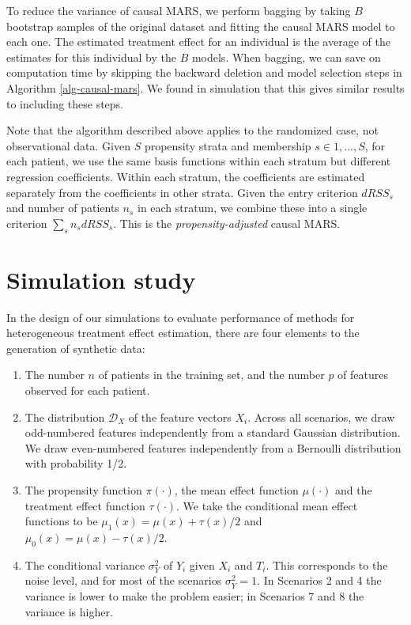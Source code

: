 \documentclass{article}
\def\D{\mathcal{D}}\def\F{\mathcal{F}}\def\K{\mathcal{K}}\def\N{\mathcal{N}}
\begin{document}
To reduce the variance of causal MARS, we perform bagging by taking $B$
bootstrap samples of the original dataset and fitting the causal MARS model to
each one. The estimated treatment effect for an individual is the average of
the estimates for this individual by the $B$ models. When bagging, we can save
on computation time by skipping the backward deletion and model selection steps
in Algorithm \ref{alg-causal-mars}. We found in simulation that this gives
similar results to including these steps.

Note that the algorithm described above applies to the randomized case, not
observational data. Given $S$ propensity strata and membership
$s \in 1, ..., S$, for each patient, we use the same basis functions within
each stratum but different regression coefficients. Within each stratum, the
coefficients are estimated separately from the coefficients in other strata.
Given the entry criterion $dRSS_s$ and number of patients $n_s$ in each
stratum, we combine these into a single criterion $\sum_sn_sdRSS_s$. This is
the {\it propensity-adjusted} causal MARS.




\section{Simulation study}
\label{sec-simulation}

In the design of our simulations to evaluate performance of methods for
heterogeneous treatment effect estimation, there are four elements to the
generation of synthetic data:
\begin{enumerate}
  \item The number $n$ of patients in the training set, and the number $p$ of
    features observed for each patient.
  \item The distribution $\D_X$ of the feature vectors $X_i$. Across all
    scenarios, we draw odd-numbered features independently from a standard
    Gaussian distribution. We draw even-numbered features independently from a
    Bernoulli distribution with probability 1/2.
  \item The propensity function $\pi(\cdot)$, the mean effect function
    $\mu(\cdot)$ and the treatment effect function $\tau(\cdot)$. We take the
    conditional mean effect functions to be $\mu_1(x) = \mu(x) + \tau(x) / 2$
    and $\mu_0(x) = \mu(x) - \tau(x) / 2$.
  \item The conditional variance $\sigma_Y^2$ of $Y_i$ given $X_i$ and $T_i$.
    This corresponds to the noise level, and for most of the scenarios
    $\sigma^2_Y = 1$. In Scenarios 2 and 4 the variance is lower to make the
    problem easier; in Scenarios 7 and 8 the variance is higher.
\end{enumerate}
\end{document}
